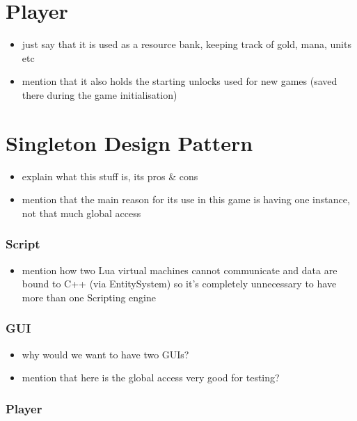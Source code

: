 \section{Player}

\begin{itemize}
    \item just say that it is used as a resource bank, keeping track
        of gold, mana, units etc
    \item mention that it also holds the starting unlocks used for new games
        (saved there during the game initialisation)
\end{itemize}

\section{Singleton Design Pattern}

\begin{itemize}
    \item explain what this stuff is, its pros \& cons
    \item mention that the main reason for its use in this game
        is having one instance, not that much global access
\end{itemize}

\subsubsection{Script}

\begin{itemize}
    \item mention how two Lua virtual machines cannot communicate
        and data are bound to C++ (via EntitySystem) so it's completely
        unnecessary to have more than one Scripting engine
\end{itemize}

\subsubsection{GUI}

\begin{itemize}
    \item why would we want to have two GUIs?
    \item mention that here is the global access very good for testing?
\end{itemize}

\subsubsection{Player}

